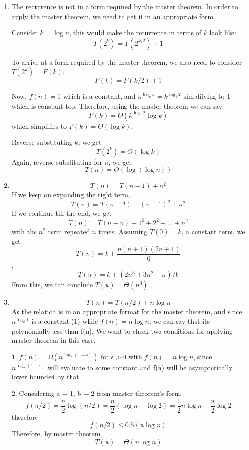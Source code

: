 \documentclass{article}[12pt]
\begin{document}
\begin{enumerate}
\item The recurrence is not in a form required by the master theorem. In order to apply the master theorem, we need to get it in an appropriate form. 

Consider \( k = \log n \), this would make the recurrence in terms of \(k\) look like:  
\[ T(2^k) = T(2^{k/2}) + 1 \]

To arrive at a form required by the master theorem, we also need to consider \( T(2^k) = F(k) \).  
\[ F(k) = F(k/2) + 1 \]

Now, \( f(n) = 1 \) which is a constant, and \( n^{\log_b a} = k^{\log_1 2} \) simplifying to 1, which is constant too. Therefore, using the master theorem we can say  
\[ F(k) = \Theta(k^{\log_1 2} \log k) \]  
which simplifies to \( F(k) = \Theta(\log k) \).

Reverse-substituting \(k\), we get  
\[ T(2^k) = \Theta(\log k) \]  
Again, reverse-substituting for \(n\), we get  
\[ T(n) = \Theta(\log(\log n)) \]

\item
\[
T(n) = T(n-1) + n^2
\]
If we keep on expanding the right term,  
\[
T(n) = T(n-2) + (n-1)^2 + n^2
\]
If we continue till the end,  
we get  
\[
T(n) = T(n-n) + 1^2 + 2^2 + \dots + n^2
\]
with the \( n^2 \) term repeated \( n \) times.  
Assuming \( T(0) = k \), a constant term,  
we get  
\[
T(n) = k + \frac{n(n+1)(2n+1)}{6}
\],
\[
T(n) = k + (2n^3 + 3n^2 +n)/6
\]
From this, we can conclude \( T(n) = \Theta(n^3) \).

\item 
\[
T(n) = T(n/2) + n \log n
\]
As the relation is in an appropriate format for the master theorem,  
and since \( n^{\log_2 1} \) is a constant (1) while \( f(n) = n \log n \), we can say that its polynomially less than f(n). We want to check two conditions for applying master theorem in this case.

1. \( f(n) = \Omega(n^{\log_2 (1+\epsilon)}) \) for \( \epsilon > 0 \) with \(f(n) = n\log n \), since \( n^{\log_2 (1+\epsilon)} \) will evaluate to some constant and f(n) will be asymptotically lower bounded by that.

2. Considering a = 1, b = 2 from master theorem's form, 
\[
f(n/2) = \frac{n}{2} \log (n/2) = \frac{n}{2} (\log n - \log 2) = \frac{1}{2} n \log n - \frac{n}{2} \log 2 
\]  
therefore
\[f(n/2) \le 0.5 (n \log n) \]
Therefore, by master theorem 
\[
T(n) = \Theta(n \log n)
\]

\end{enumerate}
\end{document}
